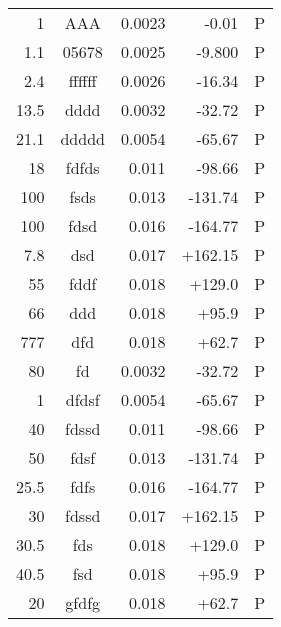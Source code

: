 \documentclass[IANZ]{MSLCalCert}
\begin{document}
\begin{longtable}{D{.}{.}{4}cD{.}{.}{4}D{.}{.}{4}c}
1 & AAA & 0.0023 & -0.01 & P\\
1.1 & 05678 & 0.0025 & -9.800 & P\\
2.4 & ffffff & 0.0026 & -16.34 & P\\
13.5 & dddd & 0.0032 & -32.72 & P\\
21.1 & ddddd & 0.0054 & -65.67 & P\\
18 & fdfds & 0.011 & -98.66 & P\\
100 & fsds & 0.013 & -131.74 & P\\
100 & fdsd & 0.016 & -164.77 & P\\
7.8 & dsd & 0.017 & +162.15 & P\\
55 & fddf & 0.018 & +129.0 & P\\
66 & ddd & 0.018 & +95.9 & P\\
777 & dfd & 0.018 & +62.7 & P\\
80 & fd & 0.0032 & -32.72 &  P\\
1 & dfdsf & 0.0054 & -65.67 & P\\
40 & fdssd & 0.011 & -98.66 & P\\
50 & fdsf & 0.013 & -131.74 & P\\
25.5 & fdfs & 0.016 & -164.77  & P\\
30 & fdssd & 0.017 & +162.15 & P\\
30.5 & fds & 0.018 & +129.0 & P\\
40.5 & fsd & 0.018 & +95.9 & P\\
20 & gfdfg & 0.018 & +62.7 & P\\

\end{longtable}
\end{document}
